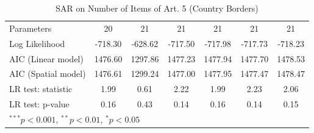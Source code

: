 \begin{table}[!h]
\begin{center}
\begin{tabular}{l c c c c c c }
Parameters              & 20           & 21           & 21           & 21           & 21           & 21           \\
Log Likelihood          & -718.30      & -628.62      & -717.50      & -717.98      & -717.73      & -718.23      \\
AIC (Linear model)      & 1476.60      & 1297.86      & 1477.23      & 1477.94      & 1477.70      & 1478.53      \\
AIC (Spatial model)     & 1476.61      & 1299.24      & 1477.00      & 1477.95      & 1477.47      & 1478.47      \\
LR test: statistic      & 1.99         & 0.61         & 2.22         & 1.99         & 2.23         & 2.06         \\
LR test: p-value        & 0.16         & 0.43         & 0.14         & 0.16         & 0.14         & 0.15         \\
\bottomrule
\multicolumn{7}{l}{\scriptsize{$^{***}p<0.001$, $^{**}p<0.01$, $^*p<0.05$}}
\end{tabular}
\caption{SAR on Number of Items of Art. 5 (Country Borders)}
\label{table:coefficients}
\end{center}
\end{table}

